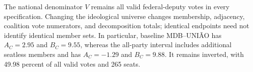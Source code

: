 \documentclass[11pt]{article}
\begin{document}

The national denominator \(V\) remains all valid federal-deputy votes in every
specification. Changing the ideological universe changes membership, adjacency,
coalition vote numerators, and decomposition totals; identical endpoints need
not identify identical member sets. In particular, baseline MDB--UNIÃO has
\(A_C=2.95\) and \(B_C=9.55\), whereas the all-party interval includes additional
seatless members and has \(A_C=-1.29\) and \(B_C=9.88\). It remains inverted,
with 49.98 percent of all valid votes and 265 seats.

\end{document}
